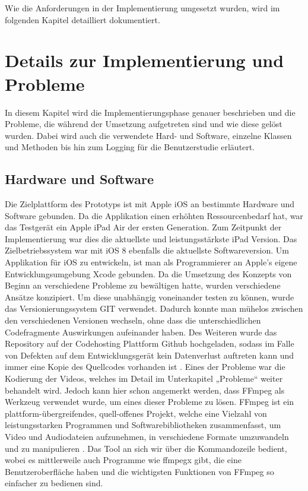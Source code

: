 \documentclass[11pt,a4paper]{report}
\begin{document}
Wie die Anforderungen in der Implementierung umgesetzt wurden, wird im folgenden Kapitel detailliert dokumentiert.

\section{Details zur Implementierung und Probleme}

In diesem Kapitel wird die Implementierungsphase genauer beschrieben und die Probleme, die während der Umsetzung aufgetreten sind und wie diese gelöst wurden. Dabei wird auch die verwendete Hard- und Software, einzelne Klassen und Methoden bis hin zum Logging für die Benutzerstudie erläutert.

\subsection{Hardware und Software}

Die Zielplattform des Prototyps ist mit Apple iOS an bestimmte Hardware und Software gebunden. Da die Applikation einen erhöhten Ressourcenbedarf hat, war das Testgerät ein Apple iPad Air der ersten Generation. Zum Zeitpunkt der Implementierung war dies die aktuellste und leistungsstärkste iPad Version. Das Zielbetriebssystem war mit iOS 8 ebenfalls die aktuellste Softwareversion. Um Applikation für iOS zu entwickeln, ist man als Programmierer an Apple’s eigene Entwicklungsumgebung Xcode gebunden. Da die Umsetzung des Konzepts von Beginn an verschiedene Probleme zu bewältigen hatte, wurden verschiedene Ansätze konzipiert. Um diese unabhängig voneinander testen zu können, wurde das Versionierungssystem GIT verwendet. Dadurch konnte man mühelos zwischen den verschiedenen Versionen wechseln, ohne dass die unterschiedlichen Codefragmente Auswirkungen aufeinander haben. Des Weiteren wurde das Repository auf der Codehosting Plattform Github hochgeladen, sodass im Falle von Defekten auf dem Entwicklungsgerät kein Datenverlust auftreten kann und immer eine Kopie des Quellcodes vorhanden ist \cite{GithubLandingPage}. Eines der Probleme war die Kodierung der Videos, welches im Detail im Unterkapitel „Probleme“ weiter behandelt wird. Jedoch kann hier schon angemerkt werden, dass FFmpeg als Werkzeug verwendet wurde, um eines dieser Probleme zu lösen. FFmpeg ist ein plattform-übergreifendes, quell-offenes Projekt, welche eine Vielzahl von leistungsstarken Programmen und Softwarebibliotheken zusammenfasst, um Video und Audiodateien aufzunehmen, in verschiedene Formate umzuwandeln und zu manipulieren \cite{FFmpegLandingPage}. Das Tool an sich wir über die Kommandozeile bedient, wobei es mittlerweile auch Programme wie ffmpegx gibt, die eine Benutzeroberfläche haben und die wichtigsten Funktionen von FFmpeg so einfacher zu bedienen sind. \cite{granneman2010mac}
\end{document}
